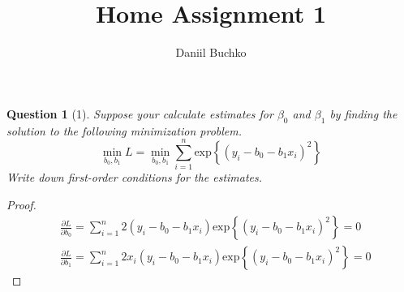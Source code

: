 \documentclass[12pt,reqno]{amsart}
\title{Home Assignment 1}
\author{Daniil Buchko}
\theoremstyle{plain}
\newtheorem*{theorem*}{Question}
\begin{document}
\maketitle

\begin{theorem*}[1]
    \normalfont
    Suppose your calculate estimates for $\beta_{0}$ and $\beta_{1}$ by finding the solution to the
    following minimization problem.
    \[
        \min_{b_0, b_1}L = \min_{b_0, b_1} \sum_{i=1}^{n}\text{exp}\left\{ (y_{i} - b_0 - b_1x_i)^{2} \right\}
    \]
    Write down first-order conditions for the estimates.
\end{theorem*}

\begin{proof}
    \begin{align*}
         & \frac{\partial L}{\partial b_{0}} =\sum_{i=1}^{n}2(y_{i} - b_0 - b_1x_i)\text{exp}\left\{ (y_{i} - b_0 - b_1x_i)^{2} \right\} = 0      \\
         & \frac{\partial L}{\partial b_{1}} =\sum_{i=1}^{n}2x_{i}(y_{i} - b_0 - b_1x_i)\text{exp}\left\{ (y_{i} - b_0 - b_1x_i)^{2} \right\} = 0
    \end{align*}
\end{proof}
\end{document}
